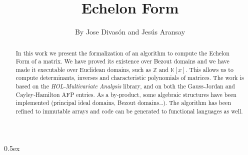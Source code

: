 \documentclass[11pt,a4paper]{article}
\begin{document}
\title{Echelon Form}
\author{By Jose Divas\'on and Jes\'us Aransay}
\maketitle

\begin{abstract}
In this work we present the formalization of an algorithm to compute the Echelon Form of
a matrix. We have proved its existence over Bezout domains and we have made it
executable over Euclidean domains, such as $\mathbb{Z}$ and $\mathbb{K}[x]$. This allows us
to compute determinants, inverses and characteristic polynomials of matrices.
The work is based on the \emph{HOL-Multivariate Analysis} library, and on both the Gauss-Jordan 
and Cayley-Hamilton AFP entries. As a by-product, some algebraic structures have been implemented (principal ideal domains, Bezout domains\dots).
The algorithm has been refined to immutable arrays and code can be generated to 
functional languages as well.
\end{abstract}

\tableofcontents

\parindent 0pt\parskip 0.5ex



%
%
\end{document}
